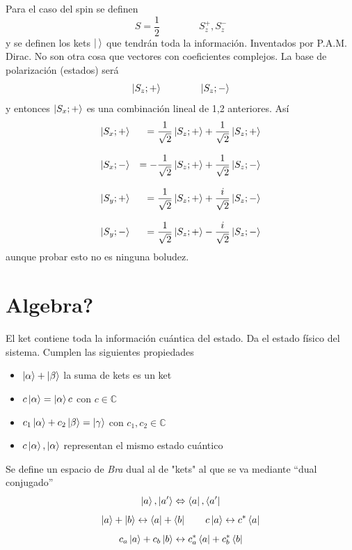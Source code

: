 \documentclass[10pt,oneside]{CBFT_book}
\begin{document}
Para el caso del spin se definen
\[	
	S =\frac{1}{2} \qquad \qquad S_z^+, S_z^-
\]
y se definen los kets $\Ket{ \: }$ que tendrán toda la información. Inventados por P.A.M. Dirac.
No son otra cosa que vectores con coeficientes complejos.
La base de polarización (estados) será
\[
	\Ket{S_z;+} \qquad \qquad \Ket{S_z;-}
\]
y entonces $\Ket{S_x;+}$ es una combinación lineal de 1,2 anteriores.
Así
\[
\begin{array}{rr}
	\Ket{S_x;+} &= \displaystyle \frac{1}{\sqrt{2}} \Ket{S_z;+} + \frac{1}{\sqrt{2}} \Ket{S_z;+} \\
	& \\
	\Ket{S_x;-} &=\displaystyle  -\frac{1}{\sqrt{2}} \Ket{S_z;+} + \frac{1}{\sqrt{2}} \Ket{S_z;-} \\
	& \\
	\Ket{S_y;+} &=\displaystyle  \frac{1}{\sqrt{2}} \Ket{S_z;+} + \frac{i}{\sqrt{2}} \Ket{S_z;-} \\
	& \\
	\Ket{S_y;-} &=\displaystyle  \frac{1}{\sqrt{2}} \Ket{S_z;+} - \frac{i}{\sqrt{2}} \Ket{S_z;-}
\end{array}
\]
aunque probar esto no es ninguna boludez.


\section{Algebra?}

El ket contiene toda la información cuántica del estado. Da el estado físico del sistema.
Cumplen las siguientes propiedades
\begin{itemize}
	\item $\Ket{\alpha} + \Ket{\beta}$ la suma de kets es un ket
	\item $c\Ket{\alpha}= \Ket{\alpha} c$ con $c\in\mathbb{C}$
	\item $c_1\Ket{\alpha} + c_2\Ket{\beta} = \Ket{\gamma}$ con $c_1,c_2 \in \mathbb{C}$
	\item $c\Ket{\alpha},\Ket{\alpha}$ representan el mismo estado cuántico
\end{itemize}

Se define un espacio de {\it Bra} dual al de "kets" al que se va mediante ``dual conjugado''
\[
	\Ket{a}, \Ket{a'} \Leftrightarrow \Bra{a}, \Bra{a'}
\]
\[
	\Ket{a} + \Ket{b} \leftrightarrow \Bra{a} + \Bra{b} \qquad 
	c\Ket{a} \leftrightarrow c^*\Bra{a}
\]
\[
	c_a \Ket{a} + c_b \Ket{b} \leftrightarrow c_a^* \Bra{a} + c_b^*\Bra{b}
\]
\end{document}
